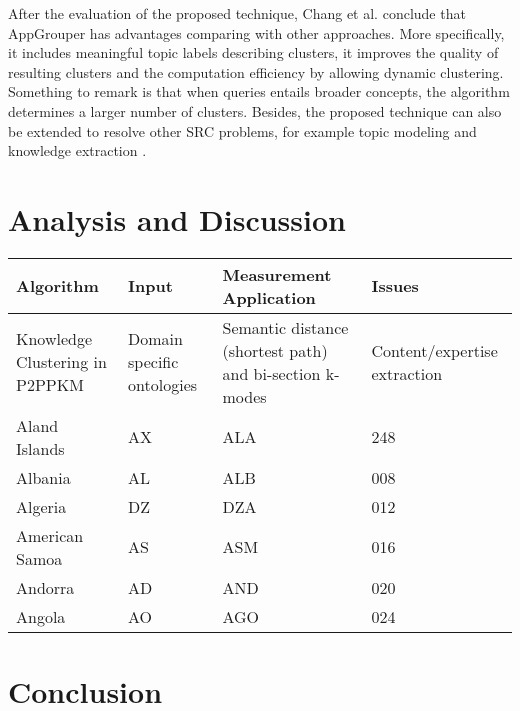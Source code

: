 \documentclass[runningheads]{llncs}
\begin{document}
After the evaluation of the proposed technique, Chang et al. \cite{Chang} conclude that AppGrouper has advantages comparing with other approaches. More specifically, it includes meaningful topic labels describing clusters, it improves the quality of resulting clusters and the computation efficiency by allowing dynamic clustering. Something to remark is that when queries entails broader concepts, the algorithm determines a larger number of clusters. Besides, the proposed technique can also be extended to resolve other SRC problems, for example topic modeling and knowledge extraction \cite{Chang}.

\section{Analysis and Discussion} \label{analysis}

 \label{table1}
\begin{tabular}{ |p{3cm}|p{3cm}|p{3cm}|p{3cm}|}
 \hline
\textbf{Algorithm} & \textbf{Input} & \textbf{Measurement}  \textbf{Application} & \textbf{Issues}\\
 \hline
 Knowledge Clustering in P2PPKM & Domain specific ontologies & Semantic distance (shortest path) and bi-section k-modes & Content/expertise extraction\\
 Aland Islands&   AX  & ALA   &248\\
 Albania &AL & ALB&  008\\
 Algeria    &DZ & DZA&  012\\
 American Samoa&   AS  & ASM&016\\
 Andorra& AD  & AND   &020\\
 Angola& AO  & AGO&024\\
 \hline
\end{tabular}


\section{Conclusion} \label{conclusion}
\end{document}
